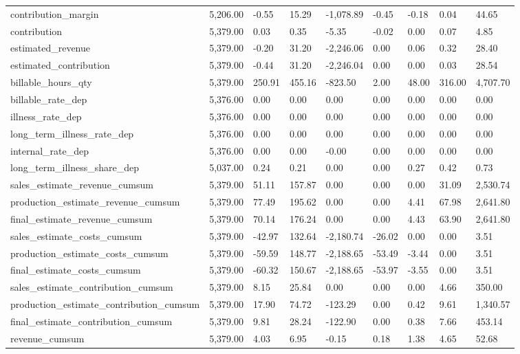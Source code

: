 \begin{tabular}{lllllllll}
contribution_margin & 5,206.00 & -0.55 & 15.29 & -1,078.89 & -0.45 & -0.18 & 0.04 & 44.65 \\
contribution & 5,379.00 & 0.03 & 0.35 & -5.35 & -0.02 & 0.00 & 0.07 & 4.85 \\
estimated_revenue & 5,379.00 & -0.20 & 31.20 & -2,246.06 & 0.00 & 0.06 & 0.32 & 28.40 \\
estimated_contribution & 5,379.00 & -0.44 & 31.20 & -2,246.04 & 0.00 & 0.00 & 0.03 & 28.54 \\
billable_hours_qty & 5,379.00 & 250.91 & 455.16 & -823.50 & 2.00 & 48.00 & 316.00 & 4,707.70 \\
billable_rate_dep & 5,376.00 & 0.00 & 0.00 & 0.00 & 0.00 & 0.00 & 0.00 & 0.00 \\
illness_rate_dep & 5,376.00 & 0.00 & 0.00 & 0.00 & 0.00 & 0.00 & 0.00 & 0.00 \\
long_term_illness_rate_dep & 5,376.00 & 0.00 & 0.00 & 0.00 & 0.00 & 0.00 & 0.00 & 0.00 \\
internal_rate_dep & 5,376.00 & 0.00 & 0.00 & -0.00 & 0.00 & 0.00 & 0.00 & 0.00 \\
long_term_illness_share_dep & 5,037.00 & 0.24 & 0.21 & 0.00 & 0.00 & 0.27 & 0.42 & 0.73 \\
sales_estimate_revenue_cumsum & 5,379.00 & 51.11 & 157.87 & 0.00 & 0.00 & 0.00 & 31.09 & 2,530.74 \\
production_estimate_revenue_cumsum & 5,379.00 & 77.49 & 195.62 & 0.00 & 0.00 & 4.41 & 67.98 & 2,641.80 \\
final_estimate_revenue_cumsum & 5,379.00 & 70.14 & 176.24 & 0.00 & 0.00 & 4.43 & 63.90 & 2,641.80 \\
sales_estimate_costs_cumsum & 5,379.00 & -42.97 & 132.64 & -2,180.74 & -26.02 & 0.00 & 0.00 & 3.51 \\
production_estimate_costs_cumsum & 5,379.00 & -59.59 & 148.77 & -2,188.65 & -53.49 & -3.44 & 0.00 & 3.51 \\
final_estimate_costs_cumsum & 5,379.00 & -60.32 & 150.67 & -2,188.65 & -53.97 & -3.55 & 0.00 & 3.51 \\
sales_estimate_contribution_cumsum & 5,379.00 & 8.15 & 25.84 & 0.00 & 0.00 & 0.00 & 4.66 & 350.00 \\
production_estimate_contribution_cumsum & 5,379.00 & 17.90 & 74.72 & -123.29 & 0.00 & 0.42 & 9.61 & 1,340.57 \\
final_estimate_contribution_cumsum & 5,379.00 & 9.81 & 28.24 & -122.90 & 0.00 & 0.38 & 7.66 & 453.14 \\
revenue_cumsum & 5,379.00 & 4.03 & 6.95 & -0.15 & 0.18 & 1.38 & 4.65 & 52.68 \\

\end{tabular}
